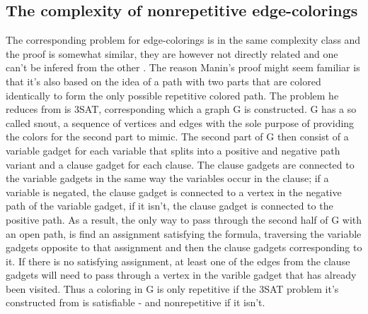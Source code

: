 \documentclass[12pt,a4paper]{article}
\begin{document}
\subsection{The complexity of nonrepetitive edge-colorings}

The corresponding problem for edge-colorings is in the same complexity class and the proof is somewhat similar, they are however not directly related and one can't be infered from the other \citep{Marx2009a}. The reason Manin's proof \citep{Manin2008} might seem familiar is that it's also based on the idea of a path with two parts that are colored identically to form the only possible repetitive colored path. The problem he reduces from is 3SAT, corresponding which a graph G is constructed. G has a so called snout, a sequence of vertices and edges with the sole purpose of providing the colors for the second part to mimic. The second part of G then consist of a variable gadget for each variable that splits into a positive and negative path variant and a clause gadget for each clause. The clause gadgets are connected to the variable gadgets in the same way the variables occur in the clause; if a variable is negated, the clause gadget is connected to a vertex in the negative path of the variable gadget, if it isn't, the clause gadget is connected to the positive path. As a result, the only way to pass through the second half of G with an open path, is find an assignment satisfying the formula, traversing the variable gadgets opposite to that assignment and then the clause gadgets corresponding to it. If there is no satisfying assignment, at least one of the edges from the clause gadgets will need to pass through a vertex in the varible gadget that has already been visited. Thus a coloring in G is only repetitive if the 3SAT problem it's constructed from is satisfiable - and nonrepetitive if it isn't.
\newline
\end{document}
